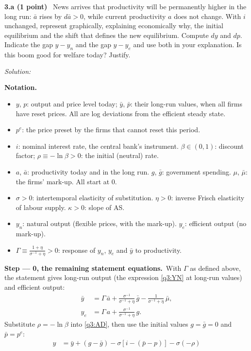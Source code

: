 \documentclass[11pt,a4paper]{article}
\newif\ifsolucoes
\newcommand{\sub}[2]{\Needspace{8\baselineskip}\par\medskip\noindent\textbf{#1 (#2)}~}
\newcommand{\resolespaco}[1][6cm]{\ifsolucoes\else\par\textit{Solution:}\vspace{#1}\par\fi}
\newcommand{\passo}[2]{\par\smallskip\noindent\textbf{Step --- #1.}~#2}
\newenvironment{notacao}{\par\smallskip\noindent\textbf{Notation.}\begin{itemize}[leftmargin=1.4em,topsep=1pt,itemsep=0pt]\small}{\end{itemize}}
\begin{document}
\sub{3.a}{1 point} News arrives that productivity will be permanently higher in the long run: $\bar a$
rises by $d\bar a>0$, while current productivity $a$ does not change. With $i$ unchanged, represent
graphically, explaining economically why, the initial equilibrium and the shift that defines the new
equilibrium. Compute $dy$ and $dp$. Indicate the gap $y-y_n$ and the gap $y-y_e$ and use both in your
explanation. Is this boom good for welfare today? Justify.
\resolespaco[7cm]
\begin{sol}
\begin{notacao}
\item $y$, $p$: output and price level today; $\bar y$, $\bar p$: their long-run values, when all
firms have reset prices. All are log deviations from the efficient steady state.
\item $p^e$: the price preset by the firms that cannot reset this period.
\item $i$: nominal interest rate, the central bank's instrument. $\beta\in(0,1)$: discount factor;
$\rho\equiv-\ln\beta>0$: the initial (neutral) rate.
\item $a$, $\bar a$: productivity today and in the long run. $g$, $\bar g$: government spending.
$\mu$, $\bar\mu$: the firms' mark-up. All start at 0.
\item $\sigma>0$: intertemporal elasticity of substitution. $\eta>0$: inverse Frisch elasticity of
labour supply. $\kappa>0$: slope of AS.
\item $y_n$: natural output (flexible prices, with the mark-up). $y_e$: efficient output (no mark-up).
\item $\Gamma\equiv\frac{1+\eta}{\sigma^{-1}+\eta}>0$: response of $y_n$, $y_e$ and $\bar y$ to
productivity.
\end{notacao}
\passo{0, the remaining statement equations}{With $\Gamma$ as defined above, the statement gives
long-run output (the expression \eqref{q3:YN} at long-run values) and efficient output:}
\begin{align}
\bar y &= \Gamma\,\bar a+\frac{\sigma^{-1}}{\sigma^{-1}+\eta}\,\bar g-\frac{1}{\sigma^{-1}+\eta}\,\bar\mu, \label{q3:ybar}\\
y_e &= \Gamma\,a+\frac{\sigma^{-1}}{\sigma^{-1}+\eta}\,g. \label{q3:ye}
\end{align}
Substitute $\rho=-\ln\beta$ into \eqref{q3:AD}, then use the initial values $g=\bar g=0$ and
$\bar p=p^e$:
\begin{align}
y &= \bar y+(g-\bar g)-\sigma\left[i-(\bar p-p)\right]-\sigma(-\rho)\nonumber\\

\end{align}
\end{sol}
\end{document}
